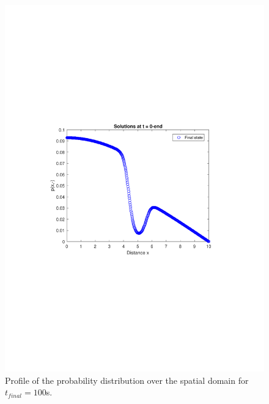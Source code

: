 \documentclass[11pt,letterpaper]{article}
\begin{document}
\begin{figure}
\centering
\includegraphics[width=1\linewidth]{./profile}
\caption{Profile of the probability distribution over the spatial domain for $t_{final} = 100$s.}
\label{fig:profile}
\end{figure}
\end{document}
